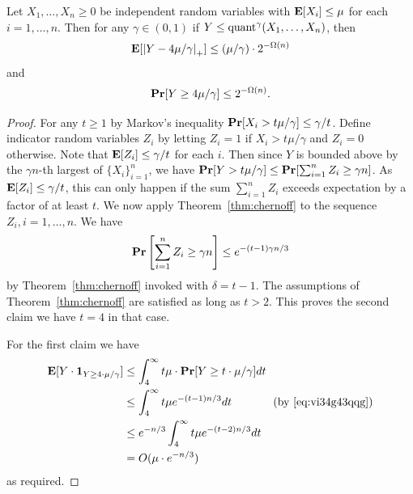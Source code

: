 \begin{lemma}\label{lm:quant-exp}
Let $X_1,\ldots, X_n\geq 0$ be independent random variables with ${\bf \mbox{\bf E}}[X_i]\leq \mu$ for each $i=1,\ldots, n$. Then for any $\gamma\in (0, 1)$ if $Y\leq\text{quant}^{\gamma} (X_1,\ldots, X_n)$,
then 
$$
{\bf \mbox{\bf E}}[\left|Y-4\mu/\gamma\right|_+]\leq (\mu/\gamma) \cdot 2^{-\Omega(n)}
$$
and 
$$
{\bf \mbox{\bf Pr}}[Y\geq 4\mu/\gamma]\leq 2^{-\Omega(n)}.
$$
\end{lemma}
\begin{proof}

For any $t\geq 1$ by Markov's inequality ${\bf \mbox{\bf Pr}}[X_i>t \mu/\gamma]\leq \gamma/t$. Define indicator random variables $Z_i$ by letting $Z_i=1$ if $X_i>t \mu/\gamma$ and $Z_i=0$ otherwise. Note that ${\bf \mbox{\bf E}}[Z_i]\leq \gamma/t$ for each $i$.
Then since $Y$ is bounded above by the $\gamma n$-th largest of $\{X_i\}_{i=1}^n$, we have ${\bf \mbox{\bf Pr}}[Y>t \mu/\gamma]\leq {\bf \mbox{\bf Pr}}[\sum_{i=1}^n Z_i\geq \gamma n]$. As ${\bf \mbox{\bf E}}[Z_i]\leq \gamma/t$, this can only happen if the sum $\sum_{i=1}^n Z_i$ exceeds expectation by a factor of at least $t$. We now apply Theorem~\ref{thm:chernoff} to the sequence $Z_i,i=1,\ldots, n$. We have
\begin{equation}\label{eq:vi34g43qqg}
{\bf \mbox{\bf Pr}}\left[\sum_{i=1}^n Z_i\geq \gamma n\right]\leq e^{-(t-1)\gamma n/3}
\end{equation}
by Theorem~\ref{thm:chernoff} invoked with $\delta=t-1$. The assumptions of Theorem~\ref{thm:chernoff} are satisfied as long as $t> 2$.  This proves the second claim we have $t=4$ in that case.

For the first claim we have
\begin{equation*}
\begin{split}
{\bf \mbox{\bf E}}[Y\cdot \mathbf{1}_{Y\geq 4\cdot \mu/\gamma}]&\leq \int_{4}^\infty t \mu \cdot {\bf \mbox{\bf Pr}}[Y\geq t\cdot \mu/\gamma]dt\\
&\leq \int_{4}^\infty t \mu e^{-(t-1)n/3}dt\text{~~~~~~~~~~ (by~\eqref{eq:vi34g43qqg})}\\
&\leq e^{-n/3}\int_{4}^\infty t \mu e^{-(t-2)n/3}dt\\
&=O(\mu\cdot e^{-n/3})
\end{split}
\end{equation*}
as required.
\end{proof}


